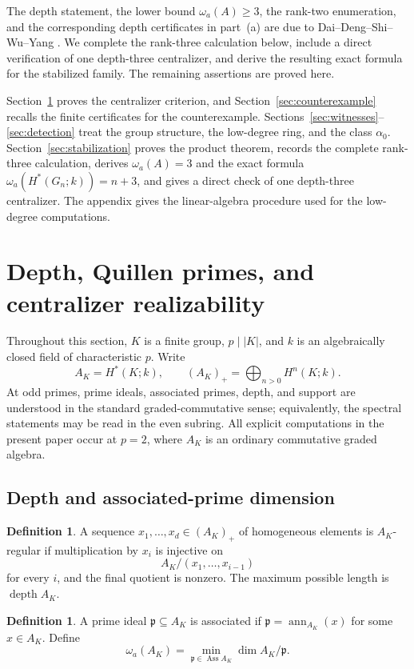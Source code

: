 \documentclass[11pt]{amsart}
\theoremstyle{definition}
\newtheorem{definition}[theorem]{Definition}
\theoremstyle{remark}
\DeclareMathOperator{\depth}{depth}
\DeclareMathOperator{\Ass}{Ass}
\DeclareMathOperator{\ann}{ann}
\begin{document}
The depth statement, the lower bound $\omega_a(A)\geq3$, the rank-two enumeration, and the corresponding depth certificates in part~(a) are due to Dai--Deng--Shi--Wu--Yang \cite{DaiEtAl2026}.  We complete the rank-three calculation below, include a direct verification of one depth-three centralizer, and derive the resulting exact formula for the stabilized family.  The remaining assertions are proved here.

Section~\ref{sec:framework} proves the centralizer criterion, and Section~\ref{sec:counterexample} recalls the finite certificates for the counterexample.  Sections~\ref{sec:witnesses}--\ref{sec:detection} treat the group structure, the low-degree ring, and the class $\alpha_0$.  Section~\ref{sec:stabilization} proves the product theorem, records the complete rank-three calculation, derives $\omega_a(A)=3$ and the exact formula $\omega_a(H^*(G_n;k))=n+3$, and gives a direct check of one depth-three centralizer.  The appendix gives the linear-algebra procedure used for the low-degree computations.

\section{Depth, Quillen primes, and centralizer realizability}
\label{sec:framework}

Throughout this section, $K$ is a finite group, $p\mid |K|$, and $k$ is an algebraically closed field of characteristic $p$.  Write
\[
A_K=H^*(K;k),
\qquad
(A_K)_+=\bigoplus_{n>0}H^n(K;k).
\]
At odd primes, prime ideals, associated primes, depth, and support are understood in the standard graded-commutative sense; equivalently, the spectral statements may be read in the even subring.  All explicit computations in the present paper occur at $p=2$, where $A_K$ is an ordinary commutative graded algebra.

\subsection{Depth and associated-prime dimension}

\begin{definition}
A sequence $x_1,\dots,x_d\in(A_K)_+$ of homogeneous elements is $A_K$-regular if multiplication by $x_i$ is injective on
\[
A_K/(x_1,\dots,x_{i-1})
\]
for every $i$, and the final quotient is nonzero.  The maximum possible length is $\depth A_K$.
\end{definition}

\begin{definition}
A prime ideal $\mathfrak p\subseteq A_K$ is associated if $\mathfrak p=\ann_{A_K}(x)$ for some $x\in A_K$.  Define
\[
\omega_a(A_K)=\min_{\mathfrak p\in\Ass A_K}\dim A_K/\mathfrak p.
\]
\end{definition}
\end{document}
